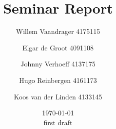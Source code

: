 \begin{titlepage}
\title{{\Huge Seminar Report}}
\author{Willem Vaandrager 4175115 \\
\and Elgar de Groot 4091108 \\
\and Johnny Verhoeff 4137175 \\
\and Hugo Reinbergen 4161173 \\
\and Koos van der Linden 4133145}
\date{\today \\ first draft}
\maketitle
\end{titlepage}
